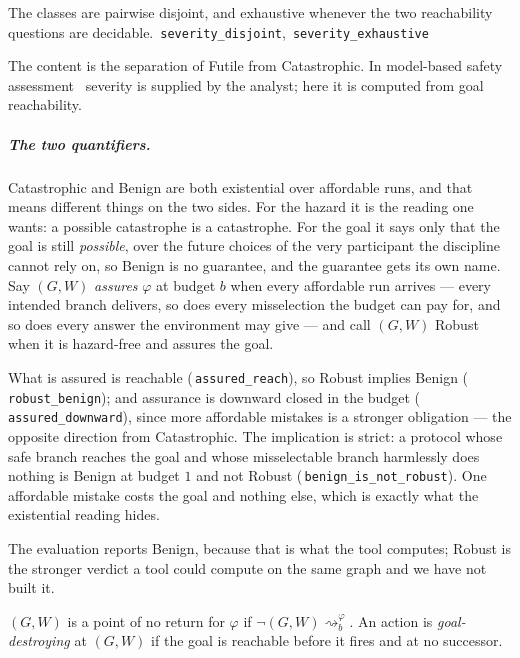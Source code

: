 \documentclass[a4paper,UKenglish,cleveref,autoref,thm-restate,anonymous]{lipics-v2021}
\newcommand{\Rob}{\textsf{Robust}}
\newcommand{\reachg}[1]{\rightsquigarrow^{\varphi}_{#1}}
\newcommand{\Ben}{\textsf{Benign}}
\newcommand{\Fut}{\textsf{Futile}}
\newcommand{\Cat}{\textsf{Catastrophic}}
\newcommand{\coqok}[1]{\textcolor{okgreen}{\ding{51}}\,\texttt{\small #1}}
\begin{document}
\begin{theorem}[Partition]\label{thm:partition}
The classes are pairwise disjoint, and exhaustive whenever the two
reachability questions are decidable. \coqok{severity\_disjoint},
\coqok{severity\_exhaustive}
\end{theorem}

The content is the separation of \Fut{} from \Cat{}. In model-based safety
assessment~\cite{xsap} severity is supplied by the analyst; here it is computed
from goal reachability.

\subparagraph*{The two quantifiers.} \Cat{} and \Ben{} are both existential
over affordable runs, and that means different things on the two sides. For
the hazard it is the reading one wants: a possible catastrophe is a
catastrophe. For the goal it says only that the goal is still \emph{possible},
over the future choices of the very participant the discipline cannot rely on,
so \Ben{} is no guarantee, and the guarantee gets its own name. Say $(G,W)$ \emph{assures} $\varphi$ at
budget $b$ when every affordable run arrives --- every intended branch
delivers, so does every misselection the budget can pay for, and so does every
answer the environment may give --- and call $(G,W)$ \Rob{} when it is
hazard-free and assures the goal.

\begin{theorem}\label{thm:robust}
What is assured is reachable (\coqok{assured\_reach}), so \Rob{} implies \Ben{}
(\coqok{robust\_benign}); and assurance is downward closed in the budget
(\coqok{assured\_downward}), since more affordable mistakes is a stronger
obligation --- the opposite direction from \Cat. The implication is strict: a
protocol whose safe branch reaches the goal and whose misselectable branch
harmlessly does nothing is \Ben{} at budget $1$ and not \Rob{}
(\coqok{benign\_is\_not\_robust}). One affordable mistake costs the goal and
nothing else, which is exactly what the existential reading hides.
\end{theorem}

The evaluation reports \Ben{}, because that is what the tool computes; \Rob{}
is the stronger verdict a tool could compute on the same graph and we have not
built it.

\begin{definition}\label{def:pnr}
$(G,W)$ is a point of no return for $\varphi$ if $\neg(G,W)\reachg{b}$. An
action is \emph{goal-destroying} at $(G,W)$ if the goal is reachable before it
fires and at no successor.
\end{definition}
\end{document}
